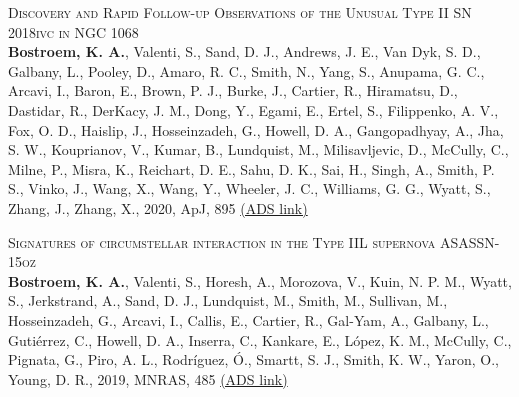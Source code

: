 \begin{revnumerate}[5]
    \item{\textsc{Discovery and Rapid Follow-up Observations of the Unusual Type II SN 2018ivc in NGC 1068}\\ 
    \textbf{Bostroem, K. A.}, Valenti, S., Sand, D. J., Andrews, J. E., Van Dyk, S. D., Galbany, L., Pooley, D., Amaro, R. C., Smith, N., Yang, S., Anupama, G. C., Arcavi, I., Baron, E., Brown, P. J., Burke, J., Cartier, R., Hiramatsu, D., Dastidar, R., DerKacy, J. M., Dong, Y., Egami, E., Ertel, S., Filippenko, A. V., Fox, O. D., Haislip, J., Hosseinzadeh, G., Howell, D. A., Gangopadhyay, A., Jha, S. W., Kouprianov, V., Kumar, B., Lundquist, M., Milisavljevic, D., McCully, C., Milne, P., Misra, K., Reichart, D. E., Sahu, D. K., Sai, H., Singh, A., Smith, P. S., Vinko, J., Wang, X., Wang, Y., Wheeler, J. C., Williams, G. G., Wyatt, S., Zhang, J., Zhang, X., 2020, ApJ, 895 
    \color{blue}\href{https://ui.adsabs.harvard.edu/abs/2020ApJ...895...31B}{(ADS link)}\color{black}}\\

    \item{\textsc{Signatures of circumstellar interaction in the Type IIL supernova ASASSN-15oz}\\ 
    \textbf{Bostroem, K. A.}, Valenti, S., Horesh, A., Morozova, V., Kuin, N. P. M., Wyatt, S., Jerkstrand, A., Sand, D. J., Lundquist, M., Smith, M., Sullivan, M., Hosseinzadeh, G., Arcavi, I., Callis, E., Cartier, R., Gal-Yam, A., Galbany, L., Gutiérrez, C., Howell, D. A., Inserra, C., Kankare, E., L\'{o}pez, K. M., McCully, C., Pignata, G., Piro, A. L., Rodr\'{i}guez, \'{O}., Smartt, S. J., Smith, K. W., Yaron, O., Young, D. R., 2019, MNRAS, 485 
    \color{blue}\href{https://ui.adsabs.harvard.edu/abs/2019MNRAS.485.5120B}{(ADS link)}\color{black}}\\
\end{revnumerate}


\vspace{0.1in}

